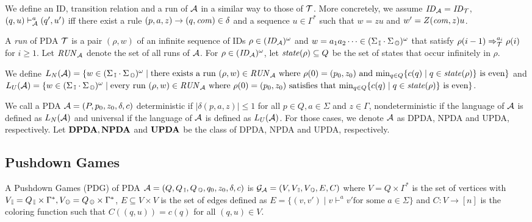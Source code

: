 
We define an ID, transition relation and
a run of ${\cal A}$ in a similar way to those of ${\cal T}$.
More concretely, we assume $\mathit{ID}_{\cal A}=\mathit{ID}_{\cal T}$,
$(q,u)\vdash^a_{\cal A}(q',u')$ iff there exist a rule $(p, a, z) \rightarrow (q, \mathit{com}) \in \delta$ and a sequence $u\in \Gamma^*$ such that $w=zu$ and $w'=Z(\mathit{com},z)u$.

A {\em run} of PDA ${\cal T}$ is a pair $(\rho, w)$ of an infinite sequence of IDs $\rho\in (\mathit{ID}_{\cal A})^\omega$ and $w = a_1 a_2 \cdots \in (\Sigma_{\, \mathbb{I}}\cdot\Sigma_{\, \mathbb{O}})^\omega$ that satisfy $\rho(i-1)\Rightarrow_{\cal T}^{a_i}\rho(i)$ for $i\geq 1$.
Let $\mathit{RUN}_{\cal A}$ denote the set of all runs of ${\cal A}$.
For $\rho \in (\mathit{ID}_{\cal A})^\omega$,
let $\mathit{state}(\rho)\subseteq Q$ be the set of states that occur infinitely in $\rho$.

We define $L_N({\cal A})=\{w\in (\Sigma_{\, \mathbb{I}} \cdot \Sigma_{\, \mathbb{O}})^\omega \mid \text{there exists a run }\allowbreak (\rho, w)\in\mathit{RUN}_{\cal A}\text{ where }\rho(0)=(p_0, z_0)\text{ and }{\rm min}_{q\in Q}\{c(q)\mid q\in\mathit{state}(\rho)\}\text{ is even}\}$ and
$L_U({\cal A})=\{w\in (\Sigma_{\, \mathbb{I}} \cdot \Sigma_{\, \mathbb{O}})^\omega \mid \text{every run }\allowbreak (\rho, w)\in\mathit{RUN}_{\cal A}\text{ where }\rho(0)=(p_0, z_0)\text{ satisfies that }{\rm min}_{q\in Q}\{c(q)\mid q\in\mathit{state}(\rho)\}\text{ is even}\}$.

We call a PDA ${\cal A}=(P, p_0, z_0, \delta, c)$ deterministic if $|\delta(p,a,z)|\leq 1$ for all $p\in Q, a\in\Sigma$ and $z\in\Gamma$,
nondeterministic if the language of ${\cal A}$ is defined as $L_N({\cal A})$ and universal if the language of ${\cal A}$ is defined as $L_U({\cal A})$.
For those cases, we denote ${\cal A}$ as DPDA, NPDA and UPDA, respectively.
Let ${\bf DPDA}, {\bf NPDA}$ and ${\bf UPDA}$ be the class of DPDA, NPDA and UPDA, respectively.

\subsection{Pushdown Games}

\begin{definition}
A {Pushdown Games} (PDG) of PDA ${\cal A} = (Q, Q_{\, \mathbb{I}}, Q_{\, \mathbb{O}}, q_0, z_0, \delta, c)$ is ${\cal G}_{\cal A} = (V, V_{\, \mathbb{I}}, V_{\, \mathbb{O}}, E, C)$ where
$V = Q\times\Gamma^*$ is the set of vertices with $V_{\, \mathbb{I}} = Q_{\, \mathbb{I}}\times\Gamma^*, V_{\, \mathbb{O}} = Q_{\, \mathbb{O}}\times\Gamma^*$, $E\subseteq V\times V$ is the set of edges defined as $E = \{(v,v') \mid v \vdash^a v' \text{for some $a\in \Sigma$}\}$
and $C: V \to [n]$ is the coloring function such that
$C((q,u)) = c(q)$ for all $(q,u)\in V$.
\end{definition}

